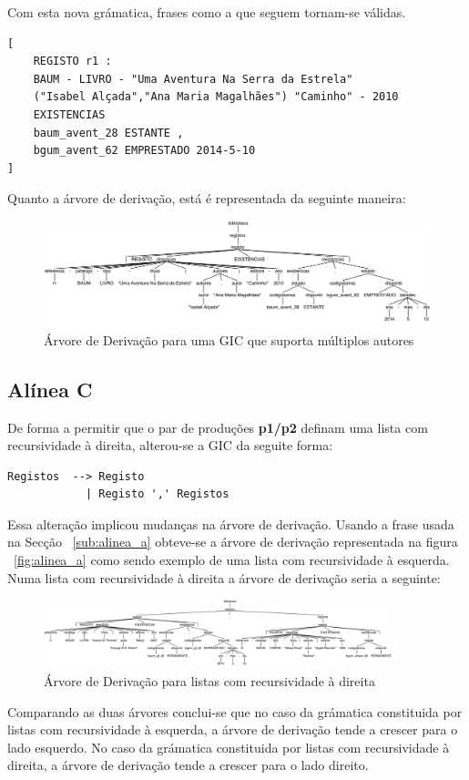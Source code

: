 Com esta nova grámatica, frases como a que seguem tornam-se válidas.

\begin{verbatim}
[
	REGISTO r1 :
	BAUM - LIVRO - "Uma Aventura Na Serra da Estrela"
	("Isabel Alçada","Ana Maria Magalhães") "Caminho" - 2010
	EXISTENCIAS
	baum_avent_28 ESTANTE ,
	bgum_avent_62 EMPRESTADO 2014-5-10
]
\end{verbatim}
Quanto a árvore de derivação, está é representada da seguinte maneira:

\begin{figure}[!h]
	\centering
    \includegraphics[width=\textwidth]{./imagens/alineab.png}
    \caption{Árvore de Derivação para uma GIC que suporta múltiplos autores}
    \label{fig:alinea_b}
\end{figure}

\subsection{Alínea C} %
\label{sub:alinea_c}

De forma a permitir que o par de produções \textbf{p1/p2} definam uma lista com recursividade à direita, alterou-se a GIC da seguite forma:

\begin{verbatim}
Registos  --> Registo
            | Registo ',' Registos
\end{verbatim}

Essa alteração implicou mudanças na árvore de derivação. Usando a frase usada na Secção ~\ref{sub:alinea_a} obteve-se a árvore de derivação representada na figura ~\ref{fig:alinea_a} como sendo exemplo de uma lista com recursividade à esquerda. Numa lista com recursividade à direita a árvore de derivação seria a seguinte:

\begin{figure}[!h]
	\centering
    \includegraphics[width=0.9\textwidth]{./imagens/alineac.png}
    \caption{Árvore de Derivação para listas com recursividade à direita}
    \label{fig:alinea_c}
\end{figure}
Comparando as duas árvores conclui-se que no caso da grámatica constituida por listas com recursividade à esquerda, a árvore de derivação tende a crescer para o lado esquerdo. No caso da grámatica constituida por listas com recursividade à direita, a árvore de derivação tende a crescer para o lado direito.

